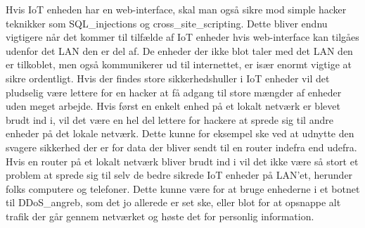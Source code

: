     Hvis IoT enheden har en web-interface, skal man også sikre mod simple hacker teknikker som \Glspl{SQL_injection} og \gls{cross_site_scripting}. Dette bliver endnu vigtigere når det kommer til tilfælde af IoT enheder hvis web-interface kan tilgåes udenfor det LAN 
    den er del af. De enheder der ikke blot taler med det LAN den er tilkoblet, men også kommunikerer ud til internettet, er især enormt vigtige at sikre ordentligt. 
    Hvis der findes store sikkerhedshuller i IoT enheder vil det pludselig være lettere for en hacker at få adgang til store mængder af enheder uden meget arbejde. Hvis først en enkelt enhed på et lokalt netværk er blevet brudt ind i, vil det være en hel del lettere for hackere at sprede sig til andre enheder på det lokale netværk. 
    Dette kunne for eksempel ske ved at udnytte den svagere sikkerhed der er for data der bliver sendt til en router indefra end udefra. Hvis en router på et lokalt netværk bliver brudt ind i vil det ikke være så stort et problem at sprede sig til selv de bedre sikrede IoT enheder på LAN'et, herunder folks computere og telefoner. Dette kunne være for at bruge enhederne i et \gls{botnet} til \Gls{DDoS_angreb}, som det jo allerede er set ske, eller blot for at opsnappe alt trafik der går gennem netværket og høste det for personlig information.\\
    
